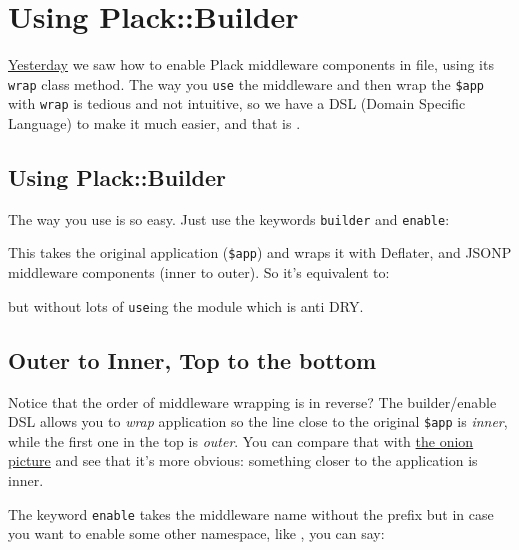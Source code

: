 \chapter{Using Plack::Builder}\label{day-11-using-plackbuilder}

\href{http://advent.plackperl.org/2009/12/day-10-using-plack-middleware.html}{Yesterday}
we saw how to enable Plack middleware components in  file, using
its \lstinline!wrap! class method. The way you \lstinline!use! the
middleware and then wrap the \lstinline!$app! with \lstinline!wrap! is
tedious and not intuitive, so we have a DSL (Domain Specific Language)
to make it much easier, and that is .

\section{Using Plack::Builder}\label{using-plackbuilder}

The way you use  is so easy. Just use the keywords
\lstinline!builder! and \lstinline!enable!:


This takes the original application (\lstinline!$app!) and wraps it with
Deflater,  and JSONP middleware components (inner to outer).
So it's equivalent to:

%
but without lots of \lstinline!use!ing the module which is anti DRY.

\section{Outer to Inner, Top to the
bottom}\label{outer-to-inner-top-to-the-bottom}

Notice that the order of middleware wrapping is in reverse? The
builder/enable DSL allows you to \emph{wrap} application so the line
close to the original \lstinline!$app! is \emph{inner}, while the first
one in the top is \emph{outer}. You can compare that with
\href{http://pylonshq.com/docs/en/0.9.7/_images/pylons_as_onion.png}{the
onion picture} and see that it's more obvious: something closer to the
application is inner.

The keyword \lstinline!enable! takes the middleware name without the
 prefix but in case you want to enable some other
namespace, like , you can say:


